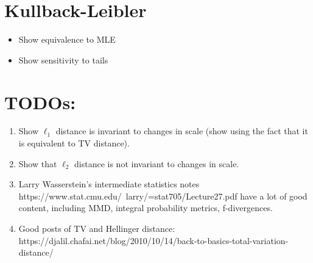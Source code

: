 \documentclass[12pt]{article}
\begin{document}
\section{Kullback-Leibler }
\begin{itemize}
\item Show equivalence to MLE
\item Show sensitivity to tails 
\end{itemize}



\section{TODOs:}
\begin{enumerate}
\item Show $\ell_1$ distance is invariant to changes in scale (show using the fact that it is equivalent to TV distance). 
\item Show that $\ell_2$ distance is not invariant to changes in scale. 
\item Larry Wasserstein's intermediate statistics notes https://www.stat.cmu.edu/~larry/=stat705/Lecture27.pdf have a lot of good content, including MMD, integral probability metrics, f-divergences. 
\item Good posts of TV and Hellinger distance: https://djalil.chafai.net/blog/2010/10/14/back-to-basics-total-variation-distance/
\end{enumerate}
\end{document}
